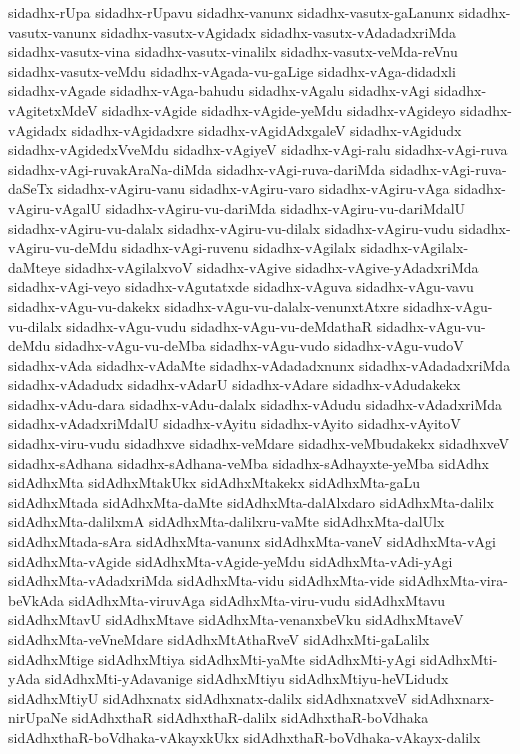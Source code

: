 {sidadhx-rUpa
sidadhx-rUpavu
sidadhx-vanunx
sidadhx-vasutx-gaLanunx
sidadhx-vasutx-vanunx
sidadhx-vasutx-vAgidadx
sidadhx-vasutx-vAdadadxriMda
sidadhx-vasutx-vina
sidadhx-vasutx-vinalilx
sidadhx-vasutx-veMda-reVnu
sidadhx-vasutx-veMdu
sidadhx-vAgada-vu-gaLige
sidadhx-vAga-didadxli
sidadhx-vAgade
sidadhx-vAga-bahudu
sidadhx-vAgalu
sidadhx-vAgi
sidadhx-vAgitetxMdeV
sidadhx-vAgide
sidadhx-vAgide-yeMdu
sidadhx-vAgideyo
sidadhx-vAgidadx
sidadhx-vAgidadxre
sidadhx-vAgidAdxgaleV
sidadhx-vAgidudx
sidadhx-vAgidedxVveMdu
sidadhx-vAgiyeV
sidadhx-vAgi-ralu
sidadhx-vAgi-ruva
sidadhx-vAgi-ruvakAraNa-diMda
sidadhx-vAgi-ruva-dariMda
sidadhx-vAgi-ruva-daSeTx
sidadhx-vAgiru-vanu
sidadhx-vAgiru-varo
sidadhx-vAgiru-vAga
sidadhx-vAgiru-vAgalU
sidadhx-vAgiru-vu-dariMda
sidadhx-vAgiru-vu-dariMdalU
sidadhx-vAgiru-vu-dalalx
sidadhx-vAgiru-vu-dilalx
sidadhx-vAgiru-vudu
sidadhx-vAgiru-vu-deMdu
sidadhx-vAgi-ruvenu
sidadhx-vAgilalx
sidadhx-vAgilalx-daMteye
sidadhx-vAgilalxvoV
sidadhx-vAgive
sidadhx-vAgive-yAdadxriMda
sidadhx-vAgi-veyo
sidadhx-vAgutatxde
sidadhx-vAguva
sidadhx-vAgu-vavu
sidadhx-vAgu-vu-dakekx
sidadhx-vAgu-vu-dalalx-venunxtAtxre
sidadhx-vAgu-vu-dilalx
sidadhx-vAgu-vudu
sidadhx-vAgu-vu-deMdathaR
sidadhx-vAgu-vu-deMdu
sidadhx-vAgu-vu-deMba
sidadhx-vAgu-vudo
sidadhx-vAgu-vudoV
sidadhx-vAda
sidadhx-vAdaMte
sidadhx-vAdadadxnunx
sidadhx-vAdadadxriMda
sidadhx-vAdadudx
sidadhx-vAdarU
sidadhx-vAdare
sidadhx-vAdudakekx
sidadhx-vAdu-dara
sidadhx-vAdu-dalalx
sidadhx-vAdudu
sidadhx-vAdadxriMda
sidadhx-vAdadxriMdalU
sidadhx-vAyitu
sidadhx-vAyito
sidadhx-vAyitoV
sidadhx-viru-vudu
sidadhxve
sidadhx-veMdare
sidadhx-veMbudakekx
sidadhxveV
sidadhx-sAdhana
sidadhx-sAdhana-veMba
sidadhx-sAdhayxte-yeMba
sidAdhx
sidAdhxMta
sidAdhxMtakUkx
sidAdhxMtakekx
sidAdhxMta-gaLu
sidAdhxMtada
sidAdhxMta-daMte
sidAdhxMta-dalAlxdaro
sidAdhxMta-dalilx
sidAdhxMta-dalilxmA
sidAdhxMta-dalilxru-vaMte
sidAdhxMta-dalUlx
sidAdhxMtada-sAra
sidAdhxMta-vanunx
sidAdhxMta-vaneV
sidAdhxMta-vAgi
sidAdhxMta-vAgide
sidAdhxMta-vAgide-yeMdu
sidAdhxMta-vAdi-yAgi
sidAdhxMta-vAdadxriMda
sidAdhxMta-vidu
sidAdhxMta-vide
sidAdhxMta-vira-beVkAda
sidAdhxMta-viruvAga
sidAdhxMta-viru-vudu
sidAdhxMtavu
sidAdhxMtavU
sidAdhxMtave
sidAdhxMta-venanxbeVku
sidAdhxMtaveV
sidAdhxMta-veVneMdare
sidAdhxMtAthaRveV
sidAdhxMti-gaLalilx
sidAdhxMtige
sidAdhxMtiya
sidAdhxMti-yaMte
sidAdhxMti-yAgi
sidAdhxMti-yAda
sidAdhxMti-yAdavanige
sidAdhxMtiyu
sidAdhxMtiyu-heVLidudx
sidAdhxMtiyU
sidAdhxnatx
sidAdhxnatx-dalilx
sidAdhxnatxveV
sidAdhxnarx-nirUpaNe
sidAdhxthaR
sidAdhxthaR-dalilx
sidAdhxthaR-boVdhaka
sidAdhxthaR-boVdhaka-vAkayxkUkx
sidAdhxthaR-boVdhaka-vAkayx-dalilx
}
